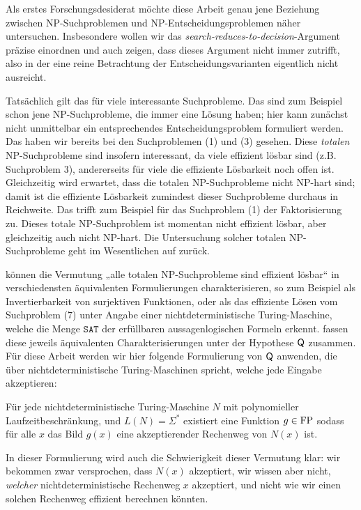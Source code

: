 Als erstes Forschungsdesiderat möchte diese Arbeit genau jene Beziehung zwischen NP-Suchproblemen und NP-Entscheidungsproblemen näher untersuchen. 
Insbesondere wollen wir das \emph{search-reduces-to-decision}-Argument präzise einordnen und auch zeigen, dass dieses Argument nicht immer zutrifft, also in der eine reine Betrachtung der Entscheidungsvarianten eigentlich nicht ausreicht. 

Tatsächlich gilt das für viele interessante Suchprobleme. Das sind zum Beispiel schon jene NP-Suchprobleme, die immer eine Lösung haben; hier kann zunächst nicht unmittelbar ein entsprechendes Entscheidungsproblem formuliert werden.
Das haben wir bereits bei den Suchproblemen (1) und (3) gesehen.
Diese \emph{totalen} NP-Suchprobleme sind insofern interessant, da viele effizient lösbar sind (z.B. Suchproblem 3), andererseits für viele die effiziente Lösbarkeit noch offen ist. Gleichzeitig wird erwartet, dass die totalen NP-Suchprobleme nicht NP-hart sind; damit ist die effiziente Lösbarkeit zumindest dieser Suchprobleme durchaus in Reichweite. 
Das trifft zum Beispiel für das Suchproblem (1) der Faktorisierung zu. Dieses totale NP-Suchproblem ist momentan nicht effizient lösbar, aber gleichzeitig auch nicht NP-hart. Die Untersuchung solcher totalen NP-Suchprobleme geht im Wesentlichen auf \textcites{johnson_how_1988}{megiddo_total_1991} zurück.

\printallnames%
\textcite{fenner_inverting_2003} können die Vermutung „alle totalen NP-Suchprobleme sind effizient lösbar“ in verschiedensten äquivalenten Formulierungen charakterisieren, so zum Beispiel als Invertierbarkeit von surjektiven Funktionen, oder als das effiziente Lösen vom Suchproblem (7) unter Angabe einer nichtdeterministische Turing-Maschine, welche die Menge $\mathtt{SAT}$ der erfüllbaren aussagenlogischen Formeln erkennt.
\citeauthor{fenner_inverting_2003} fassen diese jeweils äquivalenten Charakterisierungen unter der Hypothese $\mathsf{Q}$ zusammen. Für diese Arbeit werden wir hier folgende Formulierung von  $\mathsf{Q}$ anwenden, die über nichtdeterministische Turing-Maschinen spricht, welche jede Eingabe akzeptieren:
\begin{conjecture}\label{conj:q}
    Für jede nichtdeterministische Turing-Maschine $N$ mit polynomieller Laufzeitbeschränkung, und $L(N)=\Sigma^*$ existiert eine Funktion $g\in\mathrm{FP}$ sodass für alle $x$ das Bild $g(x)$ eine akzeptierender Rechenweg von $N(x)$ ist. 
\end{conjecture}
In dieser Formulierung wird auch die Schwierigkeit dieser Vermutung klar: wir bekommen zwar versprochen, dass $N(x)$ akzeptiert, wir wissen aber nicht, \emph{welcher} nichtdeterministische Rechenweg $x$ akzeptiert, und nicht wie wir einen solchen Rechenweg effizient berechnen könnten.

